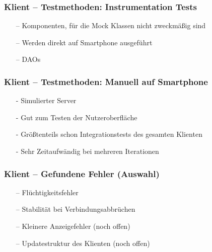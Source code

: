 \documentclass[aspectratio=1610]{beamer}
\begin{document}
\begin{frame}[plain]
        \frametitle{\textbf{Klient} -- Testmethoden: Instrumentation Tests}

        \begin{itemize}
          \item[--] Komponenten, für die Mock Klassen nicht zweckmäßig sind
          \item[--] Werden direkt auf Smartphone ausgeführt
          \item[--] DAOs
        \end{itemize}
  \end{frame}

\begin{frame}[plain]
        \frametitle{\textbf{Klient} -- Testmethoden: Manuell auf Smartphone}

        \begin{itemize}
          \item[-] Simulierter Server
          \item[-] Gut zum Testen der Nutzeroberfläche
          \item[-] Größtenteils schon Integrationstests des gesamten Klienten
          \item[-] Sehr Zeitaufwändig bei mehreren Iterationen
        \end{itemize}
  \end{frame}

\begin{frame}[plain]
        \frametitle{\textbf{Klient} -- Gefundene Fehler (Auswahl)}

        \begin{itemize}
          \item[--] Flüchtigkeitsfehler
          \item[--] Stabilität bei Verbindungsabbrüchen
          \item[--] Kleinere Anzeigefehler (noch offen)
          \item[--] Updatestruktur des Klienten (noch offen)
        \end{itemize}
  \end{frame}
\end{document}
